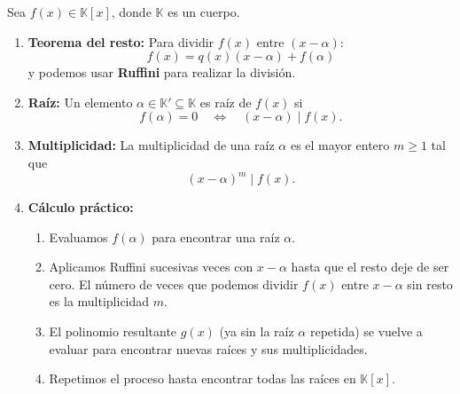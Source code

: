 \documentclass[a4paper,12pt]{article}
\begin{document}
\begin{procedimiento}[title=Raíces y multiplicidad]
Sea \(f(x) \in \mathbb{K}[x]\), donde \(\mathbb{K}\) es un cuerpo.

\begin{enumerate}
  \item \textbf{Teorema del resto:}  
  Para dividir \(f(x)\) entre \((x-\alpha)\):
  \[
  f(x) = q(x)(x-\alpha) + f(\alpha)
  \]
  y podemos usar \textbf{Ruffini} para realizar la división.

  \item \textbf{Raíz:}  
  Un elemento \(\alpha \in \mathbb{K}' \subseteq \mathbb{K}\) es raíz de \(f(x)\) si
  \[
  f(\alpha) = 0 \quad \Longleftrightarrow \quad (x-\alpha) \mid f(x).
  \]

  \item \textbf{Multiplicidad:}  
  La multiplicidad de una raíz \(\alpha\) es el mayor entero \(m \ge 1\) tal que
  \[
  (x-\alpha)^m \mid f(x).
  \]

  \item \textbf{Cálculo práctico:}  
  \begin{enumerate}
    \item Evaluamos \(f(\alpha)\) para encontrar una raíz \(\alpha\).
    \item Aplicamos Ruffini sucesivas veces con \(x-\alpha\) hasta que el resto deje de ser cero.  
          El número de veces que podemos dividir \(f(x)\) entre \(x-\alpha\) sin resto es la multiplicidad \(m\).
    \item El polinomio resultante \(g(x)\) (ya sin la raíz \(\alpha\) repetida) se vuelve a evaluar para encontrar nuevas raíces y sus multiplicidades.
    \item Repetimos el proceso hasta encontrar todas las raíces en \(\mathbb{K}[x]\).
  \end{enumerate}
\end{enumerate}
\end{procedimiento}
\end{document}
